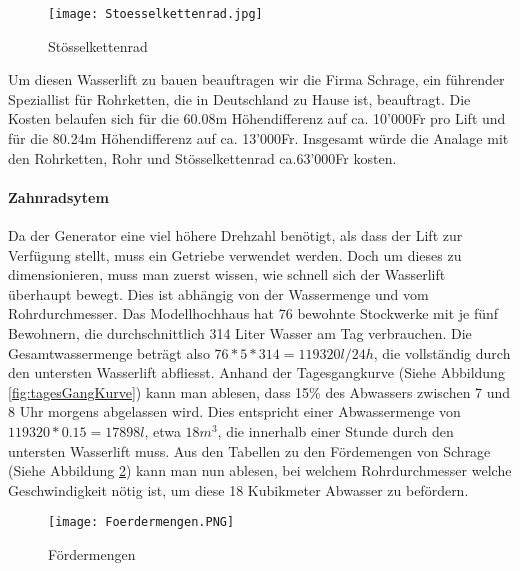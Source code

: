 \begin{figure} [H]
	\centering
	\texttt{[image: Stoesselkettenrad.jpg]}
	\caption{Stösselkettenrad \cite{schrage}}
	\label{fig:stoesselkettenrad}
\end{figure}


Um diesen Wasserlift zu bauen beauftragen wir die Firma Schrage, ein führender Speziallist für Rohrketten, die in Deutschland zu Hause ist, beauftragt. Die Kosten belaufen sich für die 60.08\si{m} Höhendifferenz auf ca. 10'000\si{Fr} pro Lift und für die 80.24\si{m} Höhendifferenz auf ca. 13'000\si{Fr}. Insgesamt würde die Analage mit den Rohrketten, Rohr und Stösselkettenrad ca.63'000\si{Fr} kosten. \cite{schrage}

\newpage

\paragraph{Zahnradsytem}
Da der Generator eine viel höhere Drehzahl benötigt, als dass der Lift zur Verfügung stellt, muss ein Getriebe verwendet werden. Doch um dieses zu dimensionieren, muss man zuerst wissen, wie schnell sich der Wasserlift überhaupt bewegt. Dies ist abhängig von der Wassermenge und vom Rohrdurchmesser. Das Modellhochhaus hat 76 bewohnte Stockwerke mit je fünf Bewohnern, die durchschnittlich 314 Liter Wasser am Tag verbrauchen. Die Gesamtwassermenge beträgt also \(76 * 5 * 314 = 119320 l/24h\), die vollständig durch den untersten Wasserlift abfliesst. Anhand der Tagesgangkurve (Siehe Abbildung \ref{fig:tagesGangKurve}) kann man ablesen, dass 15\% des Abwassers zwischen 7 und 8 Uhr morgens abgelassen wird. Dies entspricht einer Abwassermenge von \(119320 * 0.15 = 17898 l\), etwa \(18 m^3 \), die innerhalb einer Stunde durch den untersten Wasserlift muss. Aus den Tabellen zu den Fördemengen von Schrage (Siehe Abbildung \ref{fig:foerdermengen}) kann man nun ablesen, bei welchem Rohrdurchmesser welche Geschwindigkeit nötig ist, um diese 18 Kubikmeter Abwasser zu befördern. 

\begin{figure} [H]
	\centering
	\texttt{[image: Foerdermengen.PNG]}
	\caption{Fördermengen \cite{schrage}}
	\label{fig:foerdermengen}
\end{figure}

